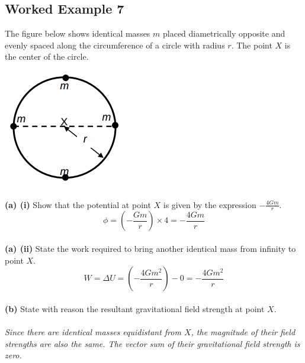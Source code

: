 \documentclass{article}
\begin{document}
\subsection*{Worked Example 7}
The figure below shows identical masses $m$ placed diametrically opposite and evenly spaced along the circumference of a circle with radius $r$. The point $X$ is the center of the circle.
\begin{center}
    \includegraphics[scale=0.6]{assets/ex7.png}
\end{center}\leavevmode
\textbf{(a) (i)} Show that the potential at point $X$ is given by the expression $-\frac{4Gm}{r}$.
\begin{equation}
    \phi=(-\frac{Gm}{r})\times4=-\frac{4Gm}{r}
\end{equation}
\\
\textbf{(a) (ii)} State the work required to bring another identical mass from infinity to point $X$.
\begin{equation}
    W=\Delta U=(-\frac{4Gm^2}{r})-0=-\frac{4Gm^2}{r}
\end{equation}
\\
\textbf{(b)} State with reason the resultant gravitational field strength at point $X$.
\\
\\\textit{Since there are identical masses equidistant from $X$, the magnitude of their field strengths are also the same. The vector sum of their gravitational field strength is zero.}
\pagebreak
\end{document}
